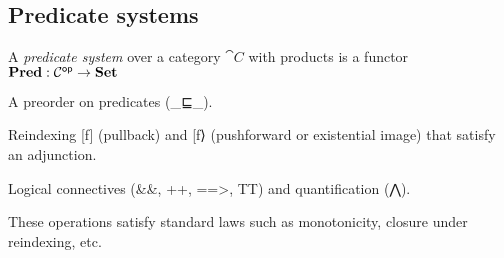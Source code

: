 \subsection{Predicate systems}
\label{sec:predicate-system}

A \emph{predicate system} over a category $\cat{C}$ with products is a functor $\mathbf{Pred}: \mathcal{C}^{\mathsf{op}} \to \mathbf{Set}$

A preorder on predicates (_⊑_).

Reindexing [f] (pullback) and [f⟩ (pushforward or existential image) that satisfy an adjunction.

Logical connectives (&&, ++, ==>, TT) and quantification (⋀).

These operations satisfy standard laws such as monotonicity, closure under reindexing, etc.
